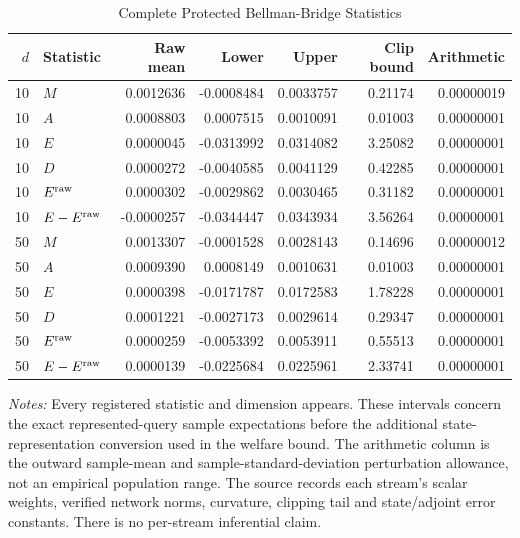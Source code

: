 \begin{table}[!htbp]
\centering
\footnotesize
\caption{Complete Protected Bellman-Bridge Statistics}\label{tab:r15mechanismfull}
\begin{tabular}{rlrrrrr}
\toprule
$d$ & Statistic & Raw mean & Lower & Upper & Clip bound & Arithmetic \\
\midrule
10 & $M$ & 0.0012636 & -0.0008484 & 0.0033757 & 0.21174 & 0.00000019 \\
10 & $A$ & 0.0008803 & 0.0007515 & 0.0010091 & 0.01003 & 0.00000001 \\
10 & $E$ & 0.0000045 & -0.0313992 & 0.0314082 & 3.25082 & 0.00000001 \\
10 & $D$ & 0.0000272 & -0.0040585 & 0.0041129 & 0.42285 & 0.00000001 \\
10 & $E^{\rm raw}$ & 0.0000302 & -0.0029862 & 0.0030465 & 0.31182 & 0.00000001 \\
10 & $E-E^{\rm raw}$ & -0.0000257 & -0.0344447 & 0.0343934 & 3.56264 & 0.00000001 \\
50 & $M$ & 0.0013307 & -0.0001528 & 0.0028143 & 0.14696 & 0.00000012 \\
50 & $A$ & 0.0009390 & 0.0008149 & 0.0010631 & 0.01003 & 0.00000001 \\
50 & $E$ & 0.0000398 & -0.0171787 & 0.0172583 & 1.78228 & 0.00000001 \\
50 & $D$ & 0.0001221 & -0.0027173 & 0.0029614 & 0.29347 & 0.00000001 \\
50 & $E^{\rm raw}$ & 0.0000259 & -0.0053392 & 0.0053911 & 0.55513 & 0.00000001 \\
50 & $E-E^{\rm raw}$ & 0.0000139 & -0.0225684 & 0.0225961 & 2.33741 & 0.00000001 \\
\bottomrule
\end{tabular}
\begin{minipage}{0.97\linewidth}\footnotesize
\emph{Notes:} Every registered statistic and dimension appears. These intervals concern the exact represented-query sample expectations before the additional state-representation conversion used in the welfare bound. The arithmetic column is the outward sample-mean and sample-standard-deviation perturbation allowance, not an empirical population range. The source records each stream's scalar weights, verified network norms, curvature, clipping tail and state/adjoint error constants. There is no per-stream inferential claim.
\end{minipage}
\end{table}
